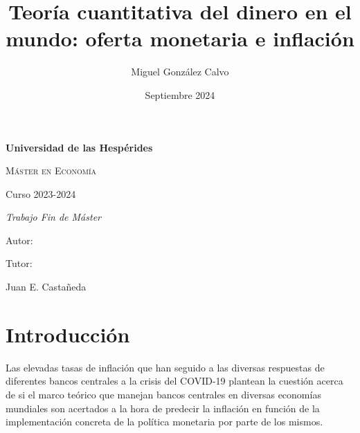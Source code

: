 \documentclass[titlepage, 12pt]{article}
\title{Teoría cuantitativa del dinero en el mundo: oferta monetaria e inflación}
\author{Miguel González Calvo}
\date{Septiembre 2024}
\begin{document}
\begin{titlepage}
    \centering
    {\bfseries\LARGE Universidad de las Hespérides \par}
    \vspace{1cm}
    {\scshape\Large Máster en Economía \par}
    \vspace{0.5cm}
    {\Large Curso 2023-2024 \par}
    \vspace{3cm}
    {\scshape\Huge \@title \par}
    \vspace{3cm}
    {\itshape\Large Trabajo Fin de Máster \par}
    \vfill
    {\Large Autor: \par}
    {\Large \@author \par}
    \vspace{2cm}
    {\Large Tutor: \par}
    {\Large Juan E. Castañeda \par}
    \vfill
    {\Large \@date \par}
\end{titlepage}
\makeatother


\tableofcontents
\newpage
\listoffigures
\listoftables

\newpage

\newpage


\newpage
\printglossary[type=acronym]

\newpage
{}

\section{Introducción}
Las elevadas tasas de inflación que han seguido a las diversas respuestas de diferentes bancos centrales a la crisis del COVID-19 plantean la cuestión acerca de si el marco teórico que manejan bancos centrales en diversas economías mundiales son acertados a la hora de predecir la inflación en función de la implementación concreta de la política monetaria por parte de los mismos.
\end{document}
